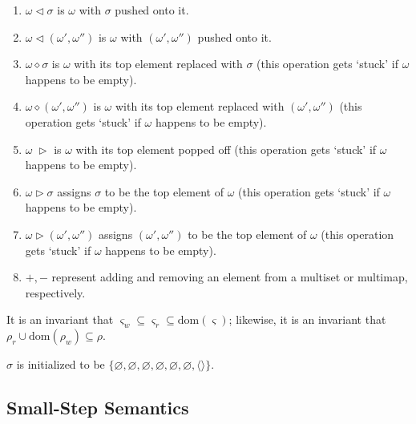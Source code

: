\documentclass[times,10pt]{article}
\begin{document}
\begin{enumerate}
    \item $\omega \triangleleft \sigma$ is $\omega$ with $\sigma$ pushed onto it.
    \item $\omega \triangleleft (\omega', \omega'')$ is $\omega$ with $(\omega', \omega'')$ pushed onto it.
    \item $\omega \diamond \sigma$ is $\omega$ with its top element replaced with $\sigma$ (this operation gets `stuck' if $\omega$ happens to be empty).
    \item $\omega \diamond (\omega', \omega'')$ is $\omega$ with its top element replaced with $(\omega', \omega'')$ (this operation gets `stuck' if $\omega$ happens to be empty).
    \item $\omega \; \triangleright$ is $\omega$ with its top element popped off (this operation gets `stuck' if $\omega$ happens to be empty).
    \item $\omega \triangleright \sigma$ assigns $\sigma$ to be the top element of $\omega$ (this operation gets `stuck' if $\omega$ happens to be empty).
    \item $\omega \triangleright (\omega', \omega'')$ assigns $(\omega', \omega'')$ to be the top element of $\omega$ (this operation gets `stuck' if $\omega$ happens to be empty).
    \item $+, -$ represent adding and removing an element from a multiset or multimap, respectively.
\end{enumerate}

It is an invariant that $\varsigma_w \subseteq \varsigma_r \subseteq \mathrm{dom}(\varsigma)$; likewise, it is an invariant that $\rho_r \cup \mathrm{dom}(\rho_w) \subseteq \rho$.

$\sigma$ is initialized to be $\{\varnothing, \varnothing, \varnothing, \varnothing, \varnothing, \varnothing, \langle \rangle\}$.

\subsection{Small-Step Semantics}
\end{document}
